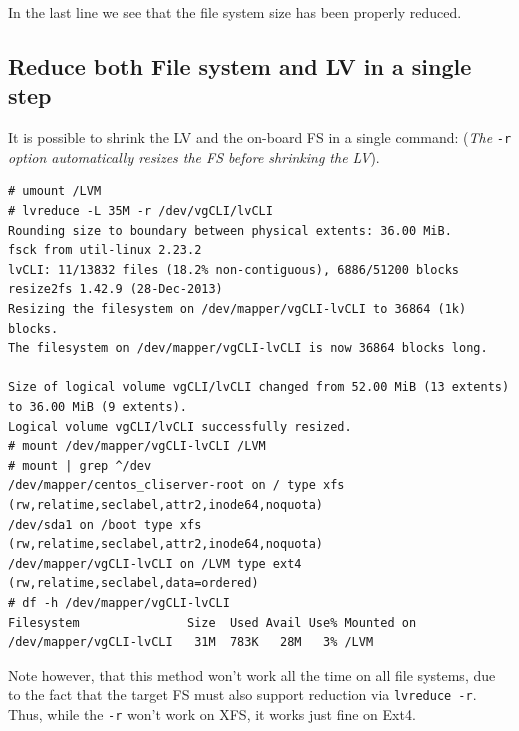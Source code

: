 \noindent
In the last line we see that the file system size has been properly reduced. 

\subsection{Reduce both File system and LV in a single step}
It is possible to shrink the LV and the on-board FS in a single command: (\textit{The} \verb|-r| \textit{option automatically resizes the FS before shrinking the LV}).

\vspace{-15pt}
\begin{verbatim}
# umount /LVM
# lvreduce -L 35M -r /dev/vgCLI/lvCLI 
Rounding size to boundary between physical extents: 36.00 MiB.
fsck from util-linux 2.23.2
lvCLI: 11/13832 files (18.2% non-contiguous), 6886/51200 blocks
resize2fs 1.42.9 (28-Dec-2013)
Resizing the filesystem on /dev/mapper/vgCLI-lvCLI to 36864 (1k) blocks.
The filesystem on /dev/mapper/vgCLI-lvCLI is now 36864 blocks long.

Size of logical volume vgCLI/lvCLI changed from 52.00 MiB (13 extents) to 36.00 MiB (9 extents).
Logical volume vgCLI/lvCLI successfully resized.
# mount /dev/mapper/vgCLI-lvCLI /LVM
# mount | grep ^/dev
/dev/mapper/centos_cliserver-root on / type xfs (rw,relatime,seclabel,attr2,inode64,noquota)
/dev/sda1 on /boot type xfs (rw,relatime,seclabel,attr2,inode64,noquota)
/dev/mapper/vgCLI-lvCLI on /LVM type ext4 (rw,relatime,seclabel,data=ordered)
# df -h /dev/mapper/vgCLI-lvCLI 
Filesystem               Size  Used Avail Use% Mounted on
/dev/mapper/vgCLI-lvCLI   31M  783K   28M   3% /LVM
\end{verbatim}
\vspace{-10pt}

\noindent
Note however, that this method won't work all the time on all file systems, due to the fact that the target FS must also support reduction via \verb|lvreduce -r|. Thus, while the \verb|-r| won't work on XFS, it works just fine on Ext4. 
